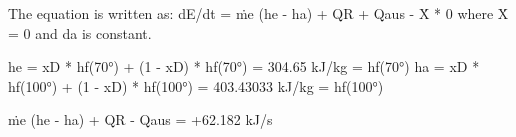 The equation is written as:  
dE/dt = ṁe (he - ha) + QR + Qaus - Ẋ * 0  
where Ẋ = 0 and da is constant.  

he = xD * hf(70°) + (1 - xD) * hf(70°) = 304.65 kJ/kg = hf(70°)  
ha = xD * hf(100°) + (1 - xD) * hf(100°) = 403.43033 kJ/kg = hf(100°)  

ṁe (he - ha) + QR - Qaus = +62.182 kJ/s